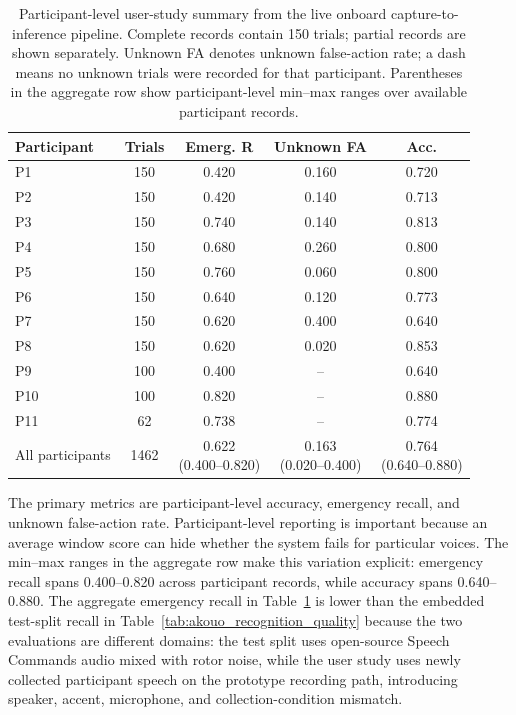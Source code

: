 \begin{table}[t]
    \centering
    \caption{Participant-level user-study summary from the live onboard capture-to-inference pipeline. Complete records contain 150 trials; partial records are shown separately. Unknown FA denotes unknown false-action rate; a dash means no unknown trials were recorded for that participant. Parentheses in the aggregate row show participant-level min--max ranges over available participant records.}
    \label{tab:user_study_participant_variability}
    \scriptsize
    \setlength{\tabcolsep}{2pt}
    \begin{tabular}{@{}lcccc@{}}
        \toprule
        Participant & Trials & Emerg. R & Unknown FA & Acc. \\
        \midrule
        P1 & 150 & 0.420 & 0.160 & 0.720 \\
        P2 & 150 & 0.420 & 0.140 & 0.713 \\
        P3 & 150 & 0.740 & 0.140 & 0.813 \\
        P4 & 150 & 0.680 & 0.260 & 0.800 \\
        P5 & 150 & 0.760 & 0.060 & 0.800 \\
        P6 & 150 & 0.640 & 0.120 & 0.773 \\
        P7 & 150 & 0.620 & 0.400 & 0.640 \\
        P8 & 150 & 0.620 & 0.020 & 0.853 \\
        P9 & 100 & 0.400 & -- & 0.640 \\
        P10 & 100 & 0.820 & -- & 0.880 \\
        P11 & 62 & 0.738 & -- & 0.774 \\
        \midrule
        All participants & 1462 & \shortstack{0.622\\(0.400--0.820)} & \shortstack{0.163\\(0.020--0.400)} & \shortstack{0.764\\(0.640--0.880)} \\
        \bottomrule
    \end{tabular}
\end{table}

The primary metrics are participant-level accuracy, emergency recall, and unknown false-action rate. Participant-level reporting is important because an average window score can hide whether the system fails for particular voices. The min--max ranges in the aggregate row make this variation explicit: emergency recall spans 0.400--0.820 across participant records, while accuracy spans 0.640--0.880. The aggregate emergency recall in Table~\ref{tab:user_study_participant_variability} is lower than the embedded test-split recall in Table~\ref{tab:akouo_recognition_quality} because the two evaluations are different domains: the test split uses open-source Speech Commands audio mixed with rotor noise, while the user study uses newly collected participant speech on the prototype recording path, introducing speaker, accent, microphone, and collection-condition mismatch.

